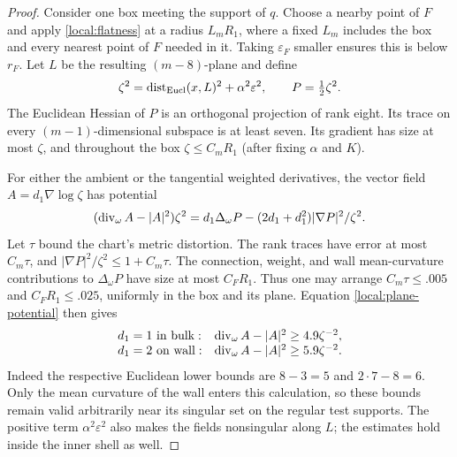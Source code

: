 \begin{proof}
Consider one box meeting the support of $q$.  Choose a nearby point
of $F$ and apply \eqref{local:flatness} at a radius $L_mR_1$,
where a fixed $L_m$ includes the box and every nearest point of
$F$ needed in it.  Taking $\varepsilon_F$ smaller ensures this is
below $r_F$.  Let $L$ be the resulting $(m-8)$-plane and define
\[
 \zeta^2=\operatorname{dist}_{\rm Eucl}(x,L)^2+\alpha^2\varepsilon^2,
 \qquad P=\tfrac12\zeta^2.
\]
The Euclidean Hessian of $P$ is an orthogonal projection of rank
eight.  Its trace on every $(m-1)$-dimensional subspace is at least
seven.  Its gradient has size at most $\zeta$, and throughout the
box $\zeta\le C_mR_1$ (after fixing $\alpha$ and $K$).

For either the ambient or the tangential weighted derivatives,
the vector field $A=d_1\nabla\log\zeta$ has potential
\begin{equation}\label{local:plane-potential}
 (\operatorname{div}_\omega A-|A|^2)\zeta^2
 =d_1\Delta_\omega P
       -(2d_1+d_1^2)|\nabla P|^2/\zeta^2.
\end{equation}
Let $\tau$ bound the chart's metric distortion.  The rank traces
have error at most $C_m\tau$, and
$|\nabla P|^2/\zeta^2\le1+C_m\tau$.  The connection, weight, and
wall mean-curvature contributions to $\Delta_\omega P$ have size
at most $C_FR_1$.  Thus one may arrange
$C_m\tau\le .005$ and $C_FR_1\le .025$, uniformly in the box and
its plane.  Equation \eqref{local:plane-potential} then gives
\[
 \begin{array}{ll}
 d_1=1\text{ in bulk}:&
       \operatorname{div}_\omega A-|A|^2\ge4.9\zeta^{-2},\\
 d_1=2\text{ on wall}:&
       \operatorname{div}_\omega A-|A|^2\ge5.9\zeta^{-2}.
 \end{array}
\]
Indeed the respective Euclidean lower bounds are $8-3=5$ and
$2\cdot7-8=6$.  Only the mean curvature of the wall enters this
calculation, so these bounds remain valid arbitrarily near its
singular set on the regular test supports.  The positive term
$\alpha^2\varepsilon^2$ also makes the fields nonsingular along
$L$; the estimates hold inside the inner shell as well.


\end{proof}
